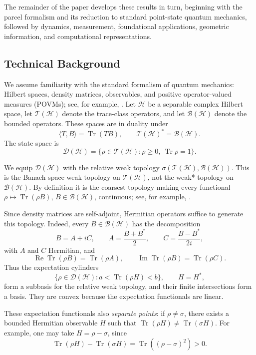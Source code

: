 \documentclass[11pt, onecolumn]{article}
\begin{document}
The remainder of the paper develops these results in turn, beginning with
the parcel formalism and its reduction to standard point-state quantum
mechanics, followed by dynamics, measurement, foundational applications,
geometric information, and computational representations.

\subsection{Technical Background}
\label{sec:technical-background}

We assume familiarity with the standard formalism of quantum mechanics:
Hilbert spaces, density matrices, observables, and positive
operator-valued measures (POVMs); see, for example,
\cite{Bengtsson2017,Conway1990,Watrous2018}. Let $\mathcal H$ be a
separable complex Hilbert space, let $\mathcal T(\mathcal H)$ denote the
trace-class operators, and let $\mathcal B(\mathcal H)$ denote the bounded
operators. These spaces are in duality under
\[
\langle T,B\rangle=\operatorname{Tr}(TB),
\qquad
\mathcal T(\mathcal H)^*=\mathcal B(\mathcal H).
\]
The state space is
\[
\mathcal D(\mathcal H)
=
\{\rho\in\mathcal T(\mathcal H):
\rho\geq0,\ \operatorname{Tr}\rho=1\}.
\]

We equip $\mathcal D(\mathcal H)$ with the relative weak topology
$\sigma(\mathcal T(\mathcal H),\mathcal B(\mathcal H))$. This is the
Banach-space weak topology on $\mathcal T(\mathcal H)$, not the weak*
topology on $\mathcal B(\mathcal H)$. By definition it is the coarsest
topology making every functional
$\rho\mapsto\operatorname{Tr}(\rho B)$, $B\in\mathcal B(\mathcal H)$,
continuous; see, for example, \cite[Ch.~V]{Conway1990}.

Since density matrices are self-adjoint, Hermitian operators suffice to
generate this topology. Indeed, every $B\in\mathcal B(\mathcal H)$ has
the decomposition
\[
B=A+iC,\qquad
A=\frac{B+B^*}{2},\qquad
C=\frac{B-B^*}{2i},
\]
with $A$ and $C$ Hermitian, and
\[
\operatorname{Re}\operatorname{Tr}(\rho B)=\operatorname{Tr}(\rho A),
\qquad
\operatorname{Im}\operatorname{Tr}(\rho B)=\operatorname{Tr}(\rho C).
\]
Thus the expectation cylinders
\[
\{\rho\in\mathcal D(\mathcal H):
a<\operatorname{Tr}(\rho H)<b\},
\qquad H=H^*,
\]
form a subbasis for the relative weak topology, and their finite
intersections form a basis. They are convex because the expectation
functionals are linear.

These expectation functionals also \emph{separate points}: if
$\rho\neq\sigma$, there exists a bounded Hermitian observable $H$ such
that
$\operatorname{Tr}(\rho H)\neq\operatorname{Tr}(\sigma H)$.
For example, one may take $H=\rho-\sigma$, since
\[
\operatorname{Tr}(\rho H)-\operatorname{Tr}(\sigma H)
=
\operatorname{Tr}((\rho-\sigma)^2)>0.
\]
\end{document}
